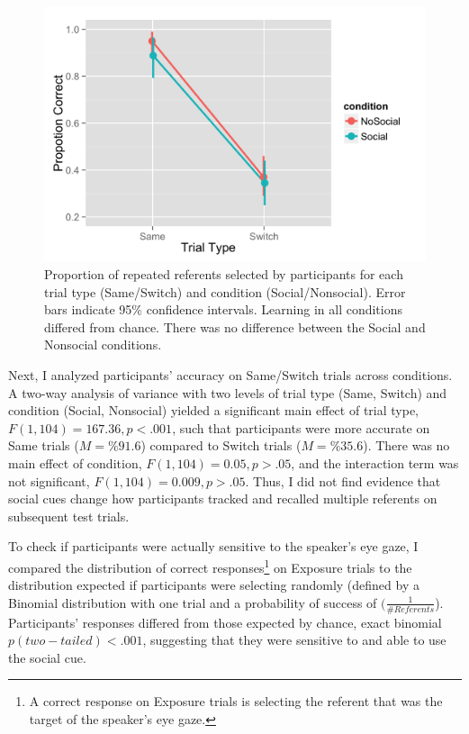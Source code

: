 \documentclass[10pt,letterpaper]{article}
\begin{document}
\begin{figure}[H]
	\centering
	\includegraphics[scale=0.15]{accuracydark.png}
	\caption{Proportion of repeated referents selected by participants for each trial type (Same/Switch) and condition (Social/Nonsocial). Error bars indicate 95\% confidence intervals. Learning in all conditions differed from chance. There was no difference between the Social and Nonsocial conditions.}
\end{figure}

Next, I analyzed participants' accuracy on Same/Switch trials across conditions. A two-way analysis of variance with two levels of trial type (Same, Switch) and condition (Social, Nonsocial) yielded a significant main effect of trial type, $F(1, 104) = 167.36, p < .001$, such that participants were more accurate on Same trials ($M = \%91.6$) compared to Switch trials ($M = \%35.6$). There was no main effect of condition, $F(1, 104) = 0.05, p > .05$, and the interaction term was not significant, $F(1, 104) = 0.009, p > .05$.  Thus, I did not find evidence that social cues change how participants tracked and recalled multiple referents on subsequent test trials.

To check if participants were actually sensitive to the speaker's eye gaze, I compared the distribution of correct responses\footnote{A correct response on Exposure trials is selecting the referent that was the target of the speaker's eye gaze.} on Exposure trials to the distribution expected if participants were selecting randomly (defined by a Binomial distribution with one trial and a probability of success of $(\frac{1}{\#Referents}$). Participants' responses differed from those expected by chance, exact binomial $p(two-tailed) < .001$, suggesting that they were sensitive to and able to use the social cue.
\end{document}
